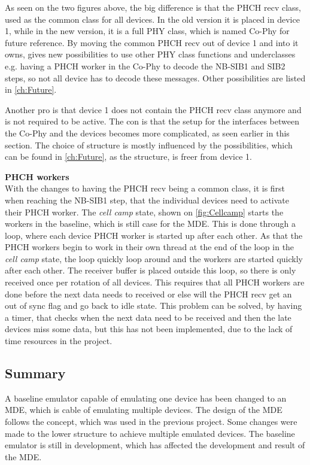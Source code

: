 As seen on the two figures above, the big difference is that the PHCH recv class, used as the common class for all devices. In the old version it is placed in device 1, while in the new version, it is a full PHY class, which is named Co-Phy for future reference. By moving the common PHCH recv out of device 1 and into it owns, gives new possibilities to use other PHY class functions and underclasses e.g. having a PHCH worker in the Co-Phy to decode the NB-SIB1 and SIB2 steps, so not all device has to decode these messages. Other possibilities are listed in \autoref{ch:Future}. 

Another pro is that device 1 does not contain the PHCH recv class anymore and is not required to be active. The con is that the setup for the interfaces between the Co-Phy and the devices becomes more complicated, as seen earlier in this section. The choice of structure is mostly influenced by the possibilities, which can be found in \autoref{ch:Future}, as the structure, is freer from device 1.

\textbf{PHCH workers}\\

With the changes to having the PHCH recv being a common class, it is first when reaching the NB-SIB1 step, that the individual devices need to activate their PHCH worker. The \textit{cell camp} state, shown on \autoref{fig:Cellcamp} starts the workers in the baseline, which is still case for the MDE. This is done through a loop, where each device PHCH worker is started up after each other. As that the PHCH workers begin to work in their own thread at the end of the loop in the \textit{cell camp} state, the loop quickly loop around and the workers are started quickly after each other. The receiver buffer is placed outside this loop, so there is only received once per rotation of all devices. This requires that all PHCH workers are done before the next data needs to received or else will the PHCH recv get an out of sync flag and go back to idle state. This problem can be solved, by having a timer, that checks when the next data need to be received and then the late devices miss some data, but this has not been implemented, due to the lack of time resources in the project.

\subsection{Summary}

A baseline emulator capable of emulating one device has been changed to an MDE, which is cable of emulating multiple devices. The design of the MDE follows the concept, which was used in the previous project. Some changes were made to the lower structure to achieve multiple emulated devices. The baseline emulator is still in development, which has affected the development and result of the MDE. 

